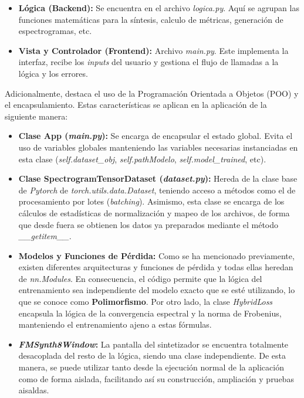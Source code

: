 \begin{itemize}
    \item \textbf{Lógica (Backend): } Se encuentra en el archivo {\textit{logica.py}}. Aquí se agrupan las funciones matemáticas para la síntesis, calculo de métricas, generación de espectrogramas, etc. 
    \item \textbf{Vista y Controlador (Frontend): } Archivo \textit{main.py}. Este implementa la interfaz, recibe los \textit{inputs} del usuario y gestiona el flujo de llamadas a la lógica y los errores.
\end{itemize}

Adicionalmente, destaca el uso de la Programación Orientada a Objetos (POO) y el encapsulamiento. Estas características se aplican en la aplicación de la siguiente manera:

\begin{itemize}
    \item \textbf{Clase App (\textit{main.py}): } Se encarga de encapsular el estado global. Evita el uso de variables globales manteniendo las variables necesarias instanciadas en esta clase (\textit{self.dataset\_obj}, \textit{self.pathModelo}, \textit{self.model\_trained}, etc).
    \item \textbf{Clase SpectrogramTensorDataset (\textit{dataset.py}): } Hereda de la clase base de \textit{Pytorch} de \textit{torch.utils.data.Dataset}, teniendo acceso a métodos como el de procesamiento por lotes (\textit{batching}). Asimismo, esta clase se encarga de los cálculos de estadísticas de normalización y mapeo de los archivos, de forma que desde fuera se obtienen los datos ya preparados mediante el método \textit{\_\_getitem\_\_}. 
    \item \textbf{Modelos y Funciones de Pérdida: } Como se ha mencionado previamente, existen diferentes arquitecturas y funciones de pérdida y todas ellas heredan de \textit{nn.Modules}. En consecuencia, el código permite que la lógica del entrenamiento sea independiente del modelo exacto que se esté utilizando, lo que se conoce como \textbf{Polimorfismo}. Por otro lado, la clase \textit{HybridLoss} encapsula la lógica de la convergencia espectral y la norma de Frobenius, manteniendo el entrenamiento ajeno a estas fórmulas. 
    \item \textbf{\textit{FMSynth8Window}: } La pantalla del sintetizador se encuentra totalmente desacoplada del resto de la lógica, siendo una clase independiente. De esta manera, se puede utilizar tanto desde la ejecución normal de la aplicación como de forma aislada, facilitando así su construcción, ampliación y pruebas aisaldas.
    

\end{itemize}


